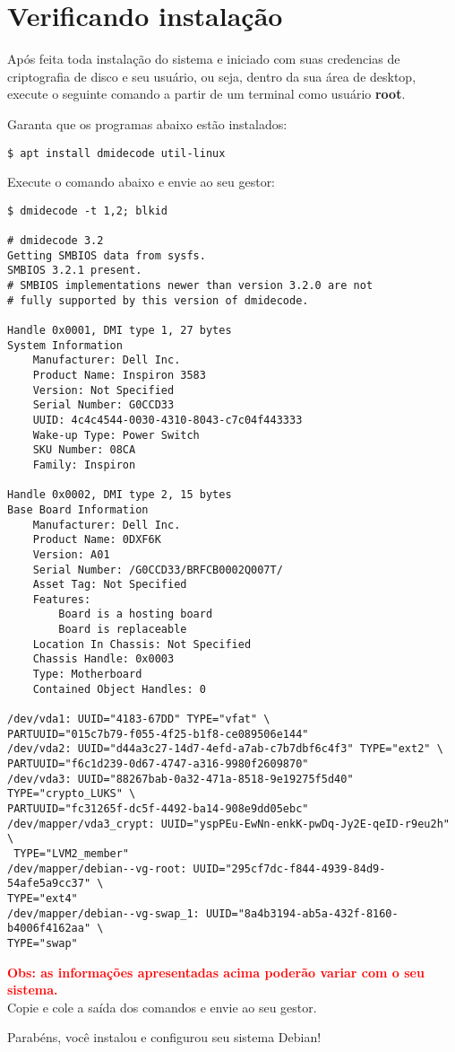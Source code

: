 \section{Verificando instalação} \label{sec:verify}
Após feita toda instalação do sistema e iniciado com suas credencias
de criptografia de disco e seu usuário, ou seja, dentro da sua área de
desktop, execute o seguinte comando a partir de um terminal como
usuário \textbf{root}.

Garanta que os programas abaixo estão instalados:

\begin{verbatim}
$ apt install dmidecode util-linux
\end{verbatim}

Execute o comando abaixo e envie ao seu gestor:

\begin{verbatim}
$ dmidecode -t 1,2; blkid

# dmidecode 3.2
Getting SMBIOS data from sysfs.
SMBIOS 3.2.1 present.
# SMBIOS implementations newer than version 3.2.0 are not
# fully supported by this version of dmidecode.

Handle 0x0001, DMI type 1, 27 bytes
System Information
	Manufacturer: Dell Inc.
	Product Name: Inspiron 3583
	Version: Not Specified
	Serial Number: G0CCD33
	UUID: 4c4c4544-0030-4310-8043-c7c04f443333
	Wake-up Type: Power Switch
	SKU Number: 08CA
	Family: Inspiron

Handle 0x0002, DMI type 2, 15 bytes
Base Board Information
	Manufacturer: Dell Inc.
	Product Name: 0DXF6K
	Version: A01
	Serial Number: /G0CCD33/BRFCB0002Q007T/
	Asset Tag: Not Specified
	Features:
		Board is a hosting board
		Board is replaceable
	Location In Chassis: Not Specified
	Chassis Handle: 0x0003
	Type: Motherboard
	Contained Object Handles: 0

/dev/vda1: UUID="4183-67DD" TYPE="vfat" \
PARTUUID="015c7b79-f055-4f25-b1f8-ce089506e144"
/dev/vda2: UUID="d44a3c27-14d7-4efd-a7ab-c7b7dbf6c4f3" TYPE="ext2" \
PARTUUID="f6c1d239-0d67-4747-a316-9980f2609870"
/dev/vda3: UUID="88267bab-0a32-471a-8518-9e19275f5d40" TYPE="crypto_LUKS" \
PARTUUID="fc31265f-dc5f-4492-ba14-908e9dd05ebc"
/dev/mapper/vda3_crypt: UUID="yspPEu-EwNn-enkK-pwDq-Jy2E-qeID-r9eu2h" \
 TYPE="LVM2_member"
/dev/mapper/debian--vg-root: UUID="295cf7dc-f844-4939-84d9-54afe5a9cc37" \
TYPE="ext4"
/dev/mapper/debian--vg-swap_1: UUID="8a4b3194-ab5a-432f-8160-b4006f4162aa" \
TYPE="swap"
\end{verbatim}
 
\textcolor{red}{\textbf{Obs: as informações apresentadas acima poderão variar com o seu sistema.}}\\

Copie e cole a saída dos comandos e envie ao seu gestor.

Parabéns, você instalou e configurou seu sistema Debian!
